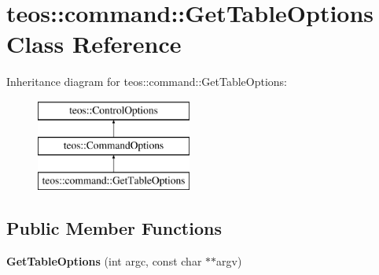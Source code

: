\hypertarget{classteos_1_1command_1_1_get_table_options}{}\section{teos\+:\+:command\+:\+:Get\+Table\+Options Class Reference}
\label{classteos_1_1command_1_1_get_table_options}
Inheritance diagram for teos\+:\+:command\+:\+:Get\+Table\+Options\+:\begin{figure}[H]
\begin{center}
\leavevmode
\includegraphics[height=3.000000cm]{classteos_1_1command_1_1_get_table_options}
\end{center}
\end{figure}
\subsection*{Public Member Functions}
\begin{DoxyCompactItemize}
\item 
\mbox{\label{classteos_1_1command_1_1_get_table_options_a36eaf178fdb3962791587e24eaa0e1b9}} 
{\bfseries Get\+Table\+Options} (int argc, const char $\ast$$\ast$argv)
\end{DoxyCompactItemize}
